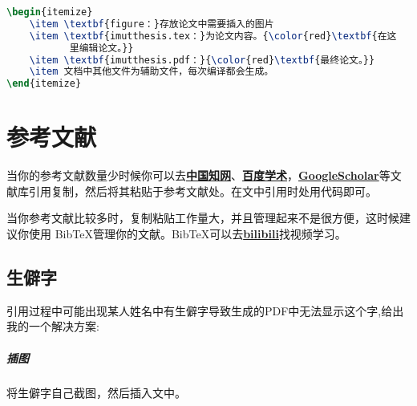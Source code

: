 \documentclass{imutthesis}
\begin{document}
\begin{lstlisting}[language=TeX]
\begin{itemize}
	\item \textbf{figure：}存放论文中需要插入的图片
	\item \textbf{imutthesis.tex：}为论文内容。{\color{red}\textbf{在这
	       里编辑论文。}}
	\item \textbf{imutthesis.pdf：}{\color{red}\textbf{最终论文。}}
	\item 文档中其他文件为辅助文件，每次编译都会生成。
\end{itemize}
\end{lstlisting} 

\section{参考文献}
当你的参考文献数量少时候你可以去\href{https://www.cnki.net/}{\textbf{中国知网}}、\href{https://xueshu.baidu.com/}{\textbf{百度学术}}，\href{https://scholar.google.com/}{\textbf{GoogleScholar}}等文献库引用复制，然后将其粘贴于参考文献处。在文中引用时处\cite{1,2,3,4,6,8,9,10}用代码即可。

当你参考文献比较多时，复制粘贴工作量大，并且管理起来不是很方便，这时候建议你使用 Bib\TeX 管理你的文献。Bib\TeX 可以去\href{https://www.bilibili.com/}{\textbf{bilibili}}找视频学习。
\subsection{生僻字}
引用过程中可能出现某人姓名中有生僻字导致生成的PDF中无法显示这个字,给出我的一个解决方案:
\subparagraph{插图}将生僻字自己截图，然后插入文中。
\end{document}
